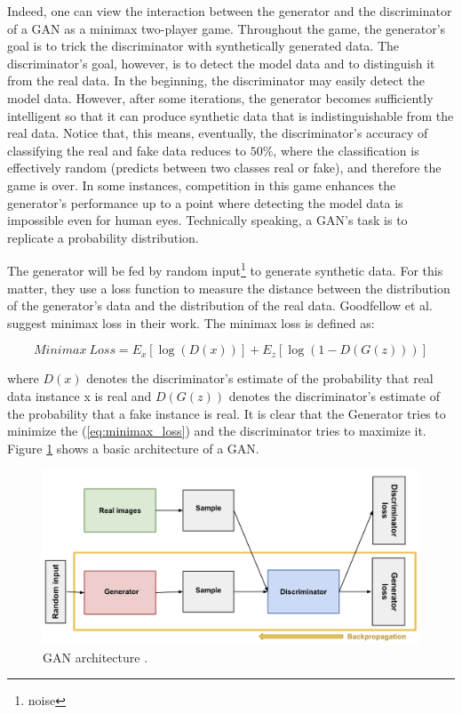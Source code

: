 Indeed, one can view the interaction between the generator and the discriminator of a GAN as a
minimax two-player game. Throughout the game, the generator's goal is to trick the discriminator
with synthetically generated data. The discriminator's goal, however, is to detect the model data
and to distinguish it from the real data. In the beginning, the discriminator may easily detect the
model data. However, after some iterations, the generator becomes sufficiently intelligent so that
it can produce synthetic data that is indistinguishable from the real data. Notice that, this means,
eventually, the discriminator's accuracy of classifying the real and fake data reduces to $50\%$,
where the classification is effectively random (predicts between two classes
real or fake), and therefore the game is over. In some instances,
competition in this game enhances the generator's performance up to a point where detecting the
model data is impossible even for human eyes.
Technically speaking,  a GAN's task is to replicate a probability distribution.

The generator will be fed by random input\footnote{noise} to generate synthetic data. For this
matter, they use a loss function to measure the distance between the distribution of the generator's
data and the distribution of the real data. Goodfellow et al. \cite{goodflew_bayesian_approach}
suggest minimax loss in their work. The minimax loss is defined as:

\begin{equation} \label{eq:minimax_loss}
  Minimax\ Loss = E_{x}[\log (D(x))]+E_{z}[\log (1-D(G(z)))]
\end{equation}


where $D(x)$  denotes the discriminator's estimate of the probability that real data instance x is
real and $D(G(z))$ denotes the discriminator's estimate of the probability that a fake instance is
real. It is clear that the Generator tries to minimize the (\ref{eq:minimax_loss}) and the
discriminator tries to maximize it. Figure \ref{fig:gan_architecture} shows a basic architecture of a
GAN.

\begin{figure}
  \centering
  \label{fig:gan_architecture}
  \includegraphics[width=1\textwidth]{fig/gan_architectur}
  \caption{GAN architecture
    \cite{google_bayesian_approach}.}
\end{figure}

